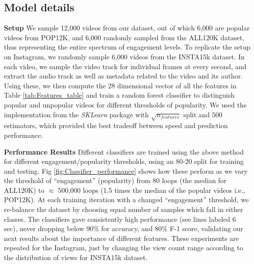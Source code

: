 \subsection{Model details}
\label{sec:model-details}
\noindent\textbf{Setup}
We sample 12,000 videos from our dataset, out of which 6,000 are popular videos from  POP12K, and 6,000 randomly sampled from the ALL120K dataset, thus representing the entire spectrum of engagement levels. To replicate the setup on Instagram, we randomly sample 6,000 videos from the INSTA15k dataset. In each video, we sample the video track for individual frames at every second, and extract the audio track as well as metadata related to the video and its author. Using these, we then compute the 28 dimensional vector of all the features in Table \ref{tab:Features_table} and train a random forest classifier to distinguish popular and unpopular videos for different thresholds of popularity. We used the implementation from the \emph{SKLearn} package with $\sqrt{n_{features}}$ split and $500$ estimators, which provided the best tradeoff between speed and prediction performance.
 
\noindent\textbf{Performance Results} 
Different classifiers are trained using the above method for different engagement/popularity thresholds, using an 80-20 split for training and testing. Fig \ref{fig:Classifier_performance} shows how these perform as we vary the threshold of ``engagement'' (popularity) from 80 loops (the median for ALL120K) to  $\approx$ 500,000 loops (1.5 times the median of the popular videos i.e., POP12K). At each training iteration with a changed ``engagement'' threshold, we re-balance the dataset by choosing equal number of samples which fall in either classes. The classifiers gave consistently high performance (see lines labeled 6 sec), never dropping below 90\% for accuracy, and 80\% F-1 score, validating our next results about the importance of different features. These experiments are repeated for the Instagram, just by changing the view count range according to the distribution of views for INSTA15k dataset.

